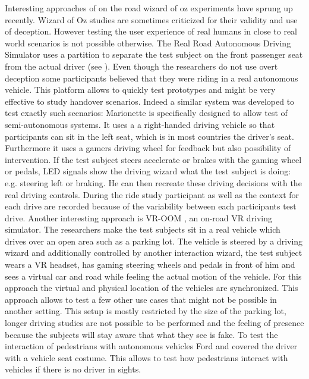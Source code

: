 Interesting approaches of on the road wizard of oz experiments have sprung up recently.  Wizard of Oz studies are sometimes criticized for their validity and use of deception\cite{Riek2012WizardGuidelines}. However  testing the user experience of real humans in close to real world scenarios is not possible otherwise. The Real Road Autonomous Driving Simulator\cite{Baltodano2015} uses a partition to separate the test subject on the front passenger seat from the actual driver (see ). Even though the researchers do not use overt deception some participants believed that they were riding in a real autonomous vehicle. This platform allows to quickly test prototypes and might be very effective to study handover scenarios. Indeed a similar system was developed to test exactly such scenarios: Marionette \cite{Wang2017} is specifically designed to allow test of semi-autonomous systems. It uses a a right-handed driving vehicle so that participants can sit in the left seat, which is in most countries the driver's seat. Furthermore it uses a gamers driving wheel for feedback but also possibility of intervention. If the test subject steers accelerate or brakes with the gaming wheel or pedals, LED signals show the driving wizard what the test subject is doing: e.g. steering left or braking. He can then recreate these driving decisions with the real driving controls. During the ride study participant as well as the context for each drive are recorded because of the variability between each participants test drive. Another interesting approach is VR-OOM \cite{Goedicke2018}, an on-road VR driving simulator. The researchers make the test subjects sit in a real vehicle which drives over an open area such as a parking lot. The vehicle is steered by a driving wizard and additionally controlled by another interaction wizard, the test subject wears a VR headset, has gaming steering wheels and pedals in front of him and sees a virtual car and road while feeling the actual motion of the vehicle. For this approach the virtual and physical location of the vehicles are synchronized. This approach allows to test a few other use cases that might not be possible in another setting. This setup is mostly restricted by the size of the parking lot, longer driving studies are not possible to be performed and the feeling of presence because the subjects will stay aware that what they see is fake. 
To test the interaction of pedestrians with autonomous vehicles Ford \cite{FordMotorCompany2017FordPeople} and \cite{Rothenbucher2016} covered the driver with a vehicle seat costume. This allows to test how pedestrians interact with vehicles if there is no driver in sights. 

